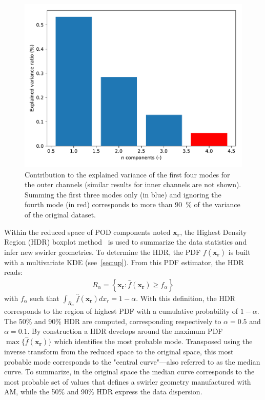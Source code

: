 \begin{figure}[!h]
\centering
\includegraphics[width=0.7\linewidth,height=\textheight,keepaspectratio]{fig/applications/swirler/variance_ratio.pdf}
\caption{Contribution to the explained variance of the first four modes for the outer channels (similar results for inner channels are not shown). Summing the first three modes only (in blue) and ignoring the fourth mode (in red) corresponds to more than 90~\% of the variance of the original dataset.}
\label{fig:variance}
\end{figure}

Within the reduced space of POD components noted $\mathbf{x_r}$, the Highest Density Region (HDR) boxplot method~\cite{Hyndman2009} is used to summarize the data statistics and infer new swirler geometries. To determine the HDR, the PDF $f(\mathbf{x_r})$ is built with a multivariate KDE (see~\cref{sec:up}). From this PDF estimator, the HDR reads:
\begin{align}
R_\alpha = \left\{ \mathbf{x_r}: \hat{f}(\mathbf{x_r}) \geq f_{\alpha} \right\}
\end{align}
\noindent with $f_{\alpha}$ such that $\int_{R_\alpha} \hat{f}(\mathbf{x_r}) d x_r = 1 - \alpha$. With this definition, the HDR corresponds to the region of highest PDF with a cumulative probability of $1-\alpha$. The 50\% and 90\% HDR are computed, corresponding respectively to $\alpha=0.5$ and $\alpha=0.1$. By construction  a HDR develops around the maximum PDF $\max \{\hat{f}(\mathbf{x_r})\}$ which identifies the most probable mode. Transposed using the inverse transform from the reduced space to the original space, this most probable mode corresponds to the "central curve"---also referred to as the median curve. To summarize, in the original space the median curve corresponds to the most probable set of values that defines a swirler geometry manufactured with AM, while the 50\% and 90\% HDR express the data dispersion.

